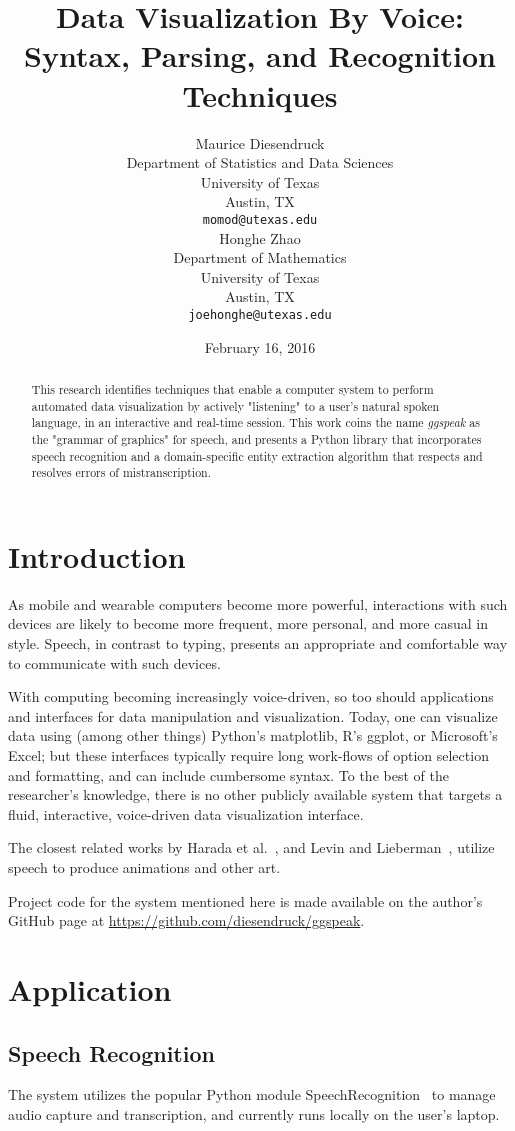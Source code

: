 \documentclass[11pt]{article}
\title{Data Visualization By Voice: Syntax, Parsing, and Recognition Techniques}
\author{Maurice Diesendruck \\
  Department of Statistics and Data Sciences\\
  University of Texas\\
  Austin, TX \\
  {\tt momod@utexas.edu} 
  \\\And
  Honghe Zhao \\
  Department of Mathematics\\
  University of Texas\\
  Austin, TX \\
  {\tt joehonghe@utexas.edu} \\
  }
\date{February 16, 2016}
\begin{document}
\maketitle
\begin{abstract} 
  This research identifies techniques that enable a computer system to perform automated data 
  visualization by actively "listening" to a user's natural spoken language, in an interactive 
  and real-time session. This work coins the name \textit{ggspeak} as the "grammar of 
  graphics" for speech, and presents a Python library that incorporates speech recognition and
  a domain-specific entity extraction algorithm that respects and resolves errors of
  mistranscription.
\end{abstract}

\section{Introduction}
As mobile and wearable computers become more powerful, interactions with such
devices are likely to become more frequent, more personal, and more casual
in style. Speech, in contrast to typing, presents an appropriate and comfortable way to
communicate with such devices. 

With computing becoming increasingly voice-driven, so too should applications and interfaces for data manipulation and visualization. Today, one can visualize data using (among other 
things) Python's matplotlib, R's ggplot, or Microsoft's Excel; but these interfaces typically 
require long work-flows of option selection and formatting, and can include cumbersome syntax. 
To the best of the researcher's knowledge, there is no other publicly available system that targets a fluid, interactive, voice-driven data visualization interface.

The closest related works by Harada et al.~, and Levin and
Lieberman~, utilize speech to produce animations and other art.

Project code for the system mentioned here is made available on the author's GitHub page at
\url{https://github.com/diesendruck/ggspeak}.

\section{Application}
\subsection{Speech Recognition}
The system utilizes the popular Python module SpeechRecognition~\cite{Zhang:16} to manage audio
capture and transcription, and currently runs locally on the user's laptop.
\end{document}
